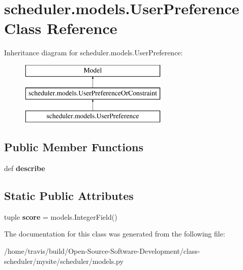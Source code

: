 \hypertarget{classscheduler_1_1models_1_1_user_preference}{\section{scheduler.\-models.\-User\-Preference Class Reference}
\label{classscheduler_1_1models_1_1_user_preference}
}
Inheritance diagram for scheduler.\-models.\-User\-Preference\-:\begin{figure}[H]
\begin{center}
\leavevmode
\includegraphics[height=3.000000cm]{classscheduler_1_1models_1_1_user_preference}
\end{center}
\end{figure}
\subsection*{Public Member Functions}
\begin{DoxyCompactItemize}
\item 
\hypertarget{classscheduler_1_1models_1_1_user_preference_a9f811ec38d568d99837e79b2b0699da6}{def {\bfseries describe}}\label{classscheduler_1_1models_1_1_user_preference_a9f811ec38d568d99837e79b2b0699da6}

\end{DoxyCompactItemize}
\subsection*{Static Public Attributes}
\begin{DoxyCompactItemize}
\item 
\hypertarget{classscheduler_1_1models_1_1_user_preference_aefe583851d963dac6a85e6f8badfbffa}{tuple {\bfseries score} = models.\-Integer\-Field()}\label{classscheduler_1_1models_1_1_user_preference_aefe583851d963dac6a85e6f8badfbffa}

\end{DoxyCompactItemize}


The documentation for this class was generated from the following file\-:\begin{DoxyCompactItemize}
\item 
/home/travis/build/\-Open-\/\-Source-\/\-Software-\/\-Development/class-\/scheduler/mysite/scheduler/models.\-py\end{DoxyCompactItemize}
